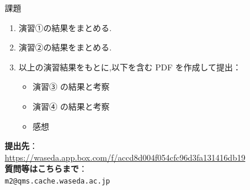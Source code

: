 \documentclass{beamer}
\begin{document}
    \begin{frame}{課題}
    
        \begin{enumerate}
          \item 演習①の結果をまとめる.
          \item 演習②の結果をまとめる.
          \item 以上の演習結果をもとに,以下を含む PDF を作成して提出：
          \begin{itemize}
            \item 演習③ の結果と考察
            \item 演習④ の結果と考察
            \item 感想
          \end{itemize}
        \end{enumerate}
        
        \textbf{提出先}：\\
        \url{https://waseda.app.box.com/f/accd8d004f054cfc96d3fa131416db19} \\
        
        \textbf{質問等はこちらまで}：\\
        \texttt{m2@qms.cache.waseda.ac.jp}
    
    \end{frame}
  

  
\end{document}
